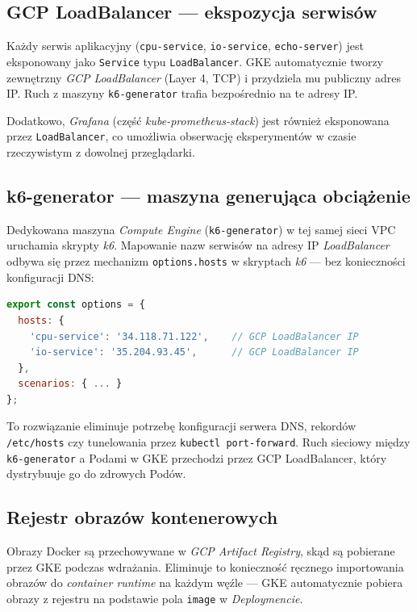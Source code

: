 \subsection{GCP LoadBalancer — ekspozycja serwisów}

Każdy serwis aplikacyjny (\texttt{cpu-service}, \texttt{io-service}, \texttt{echo-server}) jest eksponowany jako \texttt{Service} typu \texttt{LoadBalancer}. GKE automatycznie tworzy zewnętrzny \textit{GCP LoadBalancer} (Layer 4, TCP) i przydziela mu publiczny adres IP. Ruch z maszyny \texttt{k6-generator} trafia bezpośrednio na te adresy IP.

Dodatkowo, \textit{Grafana} (część \textit{kube-prometheus-stack}) jest również eksponowana przez \texttt{LoadBalancer}, co umożliwia obserwację eksperymentów w czasie rzeczywistym z dowolnej przeglądarki.

\subsection{k6-generator — maszyna generująca obciążenie}

Dedykowana maszyna \textit{Compute Engine} (\texttt{k6-generator}) w tej samej sieci VPC uruchamia skrypty \textit{k6}. Mapowanie nazw serwisów na adresy IP \textit{LoadBalancer} odbywa się przez mechanizm \texttt{options.hosts} w skryptach \textit{k6} — bez konieczności konfiguracji DNS:

\begin{lstlisting}[language=javascript, caption={Mapowanie hostów w skrypcie \textit{k6} — zamiast DNS}, label={lst:k6-hosts-arch}]
export const options = {
  hosts: {
    'cpu-service': '34.118.71.122',    // GCP LoadBalancer IP
    'io-service': '35.204.93.45',      // GCP LoadBalancer IP
  },
  scenarios: { ... }
};
\end{lstlisting}

To rozwiązanie eliminuje potrzebę konfiguracji serwera DNS, rekordów \texttt{/etc/hosts} czy tunelowania przez \texttt{kubectl port-forward}. Ruch sieciowy między \texttt{k6-generator} a Podami w GKE przechodzi przez GCP LoadBalancer, który dystrybuuje go do zdrowych Podów.

\subsection{Rejestr obrazów kontenerowych}

Obrazy Docker są przechowywane w \textit{GCP Artifact Registry}, skąd są pobierane przez GKE podczas wdrażania. Eliminuje to konieczność ręcznego importowania obrazów do \textit{container runtime} na każdym węźle — GKE automatycznie pobiera obrazy z rejestru na podstawie pola \texttt{image} w \textit{Deploymencie}.

